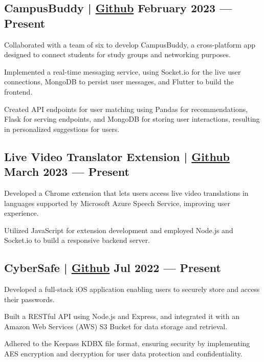 \subsection{{CampusBuddy | \href{https://github.com/pegliang/CampusBuddy}{Github} \hfill February 2023 --- Present}}
\begin{zitemize}
\item Collaborated with a team of six to develop CampusBuddy, a cross-platform app designed to connect students for study groups and networking purposes.
\item Implemented a real-time messaging service, using Socket.io for the live user connections, MongoDB to persist user messages, and Flutter to build the frontend.
\item Created API endpoints for user matching using Pandas for recommendations, Flask for serving endpoints, and MongoDB for storing user interactions, resulting in personalized suggestions for users.
\end{zitemize}

\subsection{{Live Video Translator Extension | \href{https://github.com/jerikjakobsen/Translator-Extension}{Github} \hfill March 2023 --- Present}}
\begin{zitemize}
\item Developed a Chrome extension that lets users access live video translations in languages supported by Microsoft Azure Speech Service, improving user experience.
\item Utilized JavaScript for extension development and employed Node.js and Socket.io to build a responsive backend server.
\end{zitemize}

\subsection{{CyberSafe | \href{https://github.com/jerikjakobsen/CyberSafe}{Github} \hfill Jul 2022 --- Present}}
\begin{zitemize}
\item Developed a full-stack iOS application enabling users to securely store and access their passwords.
\item Built a RESTful API using Node.js and Express, and integrated it with an Amazon Web Services (AWS) S3 Bucket for data storage and retrieval.
\item Adhered to the Keepass KDBX file format, ensuring security by implementing AES encryption and decryption for user data protection and confidentiality.
\end{zitemize}